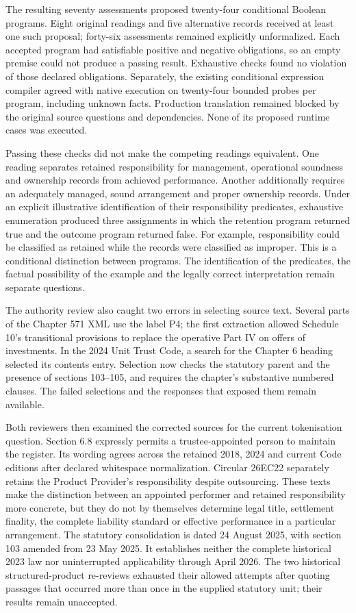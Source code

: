 The resulting seventy assessments proposed twenty-four conditional Boolean
programs. Eight original readings and five alternative records received at least
one such proposal; forty-six assessments remained explicitly unformalized.
Each accepted program had satisfiable positive and negative obligations, so an
empty premise could not produce a passing result. Exhaustive checks found no
violation of those declared obligations. Separately, the existing conditional
expression compiler agreed with native execution on twenty-four bounded probes
per program, including unknown facts. Production translation remained blocked
by the original source questions and dependencies. None of its proposed runtime
cases was executed.

Passing these checks did not make the competing readings equivalent. One
reading separates retained responsibility for management, operational soundness
and ownership records from achieved performance. Another additionally requires
an adequately managed, sound arrangement and proper ownership records. Under
an explicit illustrative identification of their responsibility predicates,
exhaustive enumeration produced three assignments in which the retention
program returned true and the outcome program returned false. For example,
responsibility could be classified as retained while the records were
classified as improper. This is a conditional distinction between programs.
The identification of the predicates, the factual possibility of the example
and the legally correct interpretation remain separate questions.

The authority review also caught two errors in selecting source text. Several
parts of the Chapter 571 XML use the label P4; the first extraction allowed
Schedule 10's transitional provisions to replace the operative Part IV on offers
of investments. In the 2024 Unit Trust Code, a search for the Chapter 6 heading
selected its contents entry. Selection now checks the statutory parent and the
presence of sections 103--105, and requires the chapter's substantive numbered
clauses. The failed selections and the responses that exposed them remain
available.

Both reviewers then examined the corrected sources for the current tokenisation
question. Section 6.8 expressly permits a trustee-appointed person to maintain
the register. Its wording agrees across the retained 2018, 2024 and current
Code editions after declared whitespace normalization. Circular 26EC22
separately retains the Product Provider's responsibility despite outsourcing.
These texts make the distinction between an appointed performer and retained
responsibility more concrete, but they do not by themselves determine legal
title, settlement finality, the complete liability standard or effective
performance in a particular arrangement. The statutory consolidation is dated
24 August 2025, with section 103 amended from 23 May 2025. It establishes
neither the complete historical 2023 law nor uninterrupted applicability through
April 2026. The two historical structured-product re-reviews exhausted their
allowed attempts after quoting passages that occurred more than once in the
supplied statutory unit; their results remain unaccepted.

